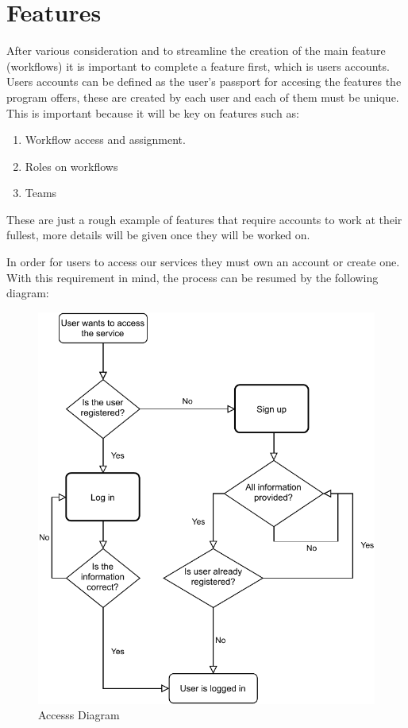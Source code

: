 \documentclass{article}[draft]
\begin{document}
\section{Features}
After various consideration and to streamline the creation of the main feature (workflows) it is important to complete a feature first, which is users accounts. Users accounts can be defined as the user's passport for accesing the features the program offers, these are created by each user and each of them must be unique. This is important because it will be key on features such as:
\begin{enumerate}
  \item Workflow access and assignment.
  \item Roles on workflows
  \item Teams
\end{enumerate}
These are just a rough example of features that require accounts to work at their fullest, more details will be given once they will be worked on.
\vspace{10}

In order for users to access our services they must own an account or create one. With this requirement in mind, the process can be resumed by the following diagram:

\begin{figure}[h!]
    \centering
    \includegraphics[scale=0.75]{Images/AccessDiagram.pdf}
    \caption{Accesss Diagram}
    \label{fig: figure 1}
\end{figure}
\end{document}
